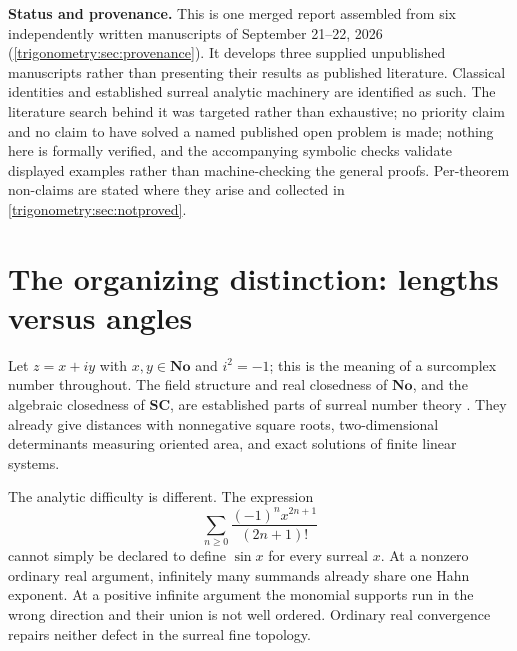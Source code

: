\documentclass[11pt,letterpaper]{article}
\numberwithin{equation}{section}
\theoremstyle{definition}
\theoremstyle{remark}
\newcommand{\No}{\mathbf{No}}
\newcommand{\SC}{\mathbf{SC}}
\newcommand{\Z}{\mathbb Z}
\newcommand{\SO}{\operatorname{SO}}
\begin{document}
\begin{titlepage}
\begin{minipage}{0.94\textwidth}
\begin{abstract}
Finally we classify the freedom in extending circular trigonometry to infinite real arguments.
The Ehrlich--Kaplan integer-part normalization is one member of a character family; every member
necessarily acquires infinite periods, and none admits a bounded common-domain Hahn-analytic
description at infinite frequency. Two further sections treat the
rotation group $\SO(2,\No)$ and the arithmetic of the periods, where exponentials with the initial
kernel-multiplier ring $\Z$ give a partial negative answer to a robustness question of Ehrlich and
Kaplan, which stays open.
\end{abstract}
\end{minipage}
\vfill
\begin{minipage}{0.94\textwidth}\small
\textbf{Status and provenance.} This is one merged report assembled from six independently
written manuscripts of September 21--22, 2026 (\cref{trigonometry:sec:provenance}). It develops three supplied unpublished manuscripts
rather than presenting their results as published literature. Classical identities and established
surreal analytic machinery are identified as such. The literature search behind it was targeted
rather than exhaustive; no priority claim and no claim to have solved a named published open
problem is made; nothing here is formally verified, and the accompanying symbolic checks validate
displayed examples rather than machine-checking the general proofs. Per-theorem non-claims are
stated where they arise and collected in \cref{trigonometry:sec:notproved}.
\end{minipage}
\end{titlepage}
\setcounter{page}{2}
\begingroup
\small
\setlength{\parskip}{0pt}
\tableofcontents
\endgroup
\clearpage

\section{The organizing distinction: lengths versus angles}\label{trigonometry:sec:intro}

Let $z=x+iy$ with $x,y\in\No$ and $i^2=-1$; this is the meaning of a surcomplex number
throughout. The field structure and real closedness of $\No$, and the algebraic closedness of
$\SC$, are established parts of surreal number theory \cite{Conway,Gonshor,Alling,vdDE,Poonen}.
They already give distances with nonnegative square roots, two-dimensional determinants measuring
oriented area, and exact solutions of finite linear systems.

The analytic difficulty is different. The expression
\[
 \sum_{n\ge0}\frac{(-1)^nx^{2n+1}}{(2n+1)!}
\]
cannot simply be declared to define $\sin x$ for every surreal $x$. At a nonzero ordinary real
argument, infinitely many summands already share one Hahn exponent. At a positive infinite
argument the monomial supports run in the wrong direction and their union is not well ordered.
Ordinary real convergence repairs neither defect in the surreal fine topology.
\end{document}
